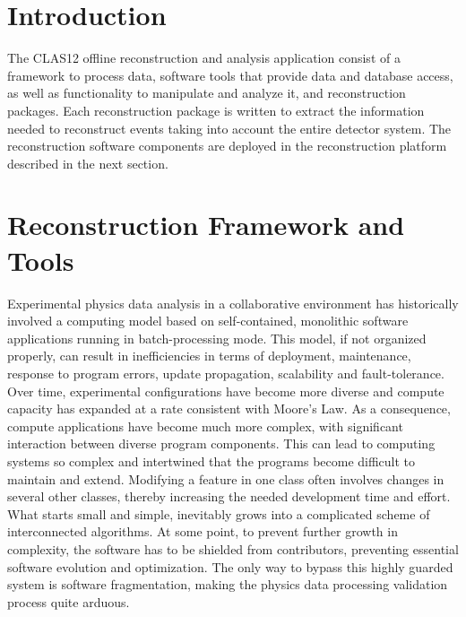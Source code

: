 \documentclass[3p,times,twocolumn]{elsarticle}
\begin{document}
\tableofcontents


\section{Introduction}

The CLAS12 offline reconstruction and analysis application consist of a framework to process data,
software tools that provide data and database access, as well as functionality to manipulate and
analyze it, and reconstruction packages.  Each reconstruction package is written to extract
the information needed to reconstruct events taking into account the entire detector system.
The reconstruction software components are deployed in the reconstruction platform described
in the next section.


\section{Reconstruction Framework and Tools}

Experimental physics data analysis in a collaborative environment has historically involved
a computing model based on self-contained, monolithic software applications
running in batch-processing mode.
This model, if not organized properly, can result in inefficiencies in terms
of deployment, maintenance, response to program errors, update propagation,
scalability and fault-tolerance.
Over time, experimental configurations have become more diverse and compute capacity
has expanded at a rate consistent with Moore's Law. As a consequence,
compute applications have become much more complex,
with significant interaction between diverse program components.  This can
lead to computing systems so complex and intertwined that the programs become
difficult to maintain and extend. Modifying a feature
in one class often involves changes in several other classes, thereby increasing the needed development
time and effort. What starts small and simple, inevitably grows into a complicated scheme of interconnected
algorithms. At some point, to prevent further growth in complexity, the software has to be shielded from
contributors, preventing essential software evolution and optimization. The only way to bypass this highly
guarded system is software fragmentation, making the physics data processing validation process quite
arduous.
\end{document}

